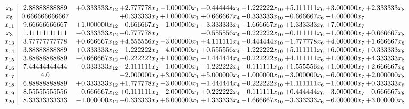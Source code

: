 \documentclass[10pt]{article}
\begin{document}
 \[\begin{array}{c| c c@{\hskip 2pt} c@{\hskip 2pt} c@{\hskip 2pt} c@{\hskip 2pt} c@{\hskip 2pt} c@{\hskip 2pt} c@{\hskip 2pt} c@{\hskip 2pt} }
 x_{9}   &  2.88888888889 & + 0.333333 x_{12} & + 2.777778 x_{2} & -1.000000 x_{1} & -0.444444 x_{4} & + 1.222222 x_{10} & + 5.111111 x_{6} & + 3.000000 x_{7} & + 2.333333 x_{8}\\
 x_{5}   &  0.666666666667  &   & + 0.333333 x_{2} & + 1.000000 x_{1} & + 0.666667 x_{4} & -0.333333 x_{10} & -0.666667 x_{6} & -1.000000 x_{7} &   \\
 x_{11}   &  9.66666666667 & + 1.000000 x_{12} & -0.666667 x_{2} & -1.000000 x_{1} & -3.333333 x_{4} & + 1.666667 x_{10} & + 1.333333 x_{6} & + 7.000000 x_{7} &   \\
 x_{3}   &  1.11111111111 & -0.333333 x_{12} & -0.777778 x_{2} &   & -0.555556 x_{4} & -0.222222 x_{10} & -0.111111 x_{6} & -1.000000 x_{7} & + 0.666667 x_{8}\\
 x_{13}   &  3.77777777778 & + 0.666667 x_{12} & + 4.555556 x_{2} & -3.000000 x_{1} & + 4.111111 x_{4} & + 0.444444 x_{10} & -1.777778 x_{6} & + 4.000000 x_{7} & + 1.666667 x_{8}\\
 x_{14}   &  3.88888888889 & + 0.333333 x_{12} & -1.222222 x_{2} & -4.000000 x_{1} & + 0.555556 x_{4} & + 1.222222 x_{10} & + 5.111111 x_{6} & + 6.000000 x_{7} & + 0.333333 x_{8}\\
 x_{15}   &  3.88888888889 & -0.666667 x_{12} & -0.222222 x_{2} & + 1.000000 x_{1} & -1.444444 x_{4} & + 0.222222 x_{10} & + 4.111111 x_{6} & + 1.000000 x_{7} & + 4.333333 x_{8}\\
 x_{16}   &  7.44444444444 & -0.333333 x_{12} & -2.111111 x_{2} & -1.000000 x_{1} & -1.222222 x_{4} & + 0.111111 x_{10} & + 1.555556 x_{6} & + 1.000000 x_{7} & + 2.666667 x_{8}\\
 x_{17}   &  4.0  &   & -2.000000 x_{2} & + 3.000000 x_{1} & + 5.000000 x_{4} & -1.000000 x_{10} & -3.000000 x_{6} & -6.000000 x_{7} & + 2.000000 x_{8}\\
 x_{18}   &  6.88888888889 & + 0.333333 x_{12} & + 1.777778 x_{2} & -3.000000 x_{1} & -1.444444 x_{4} & + 0.222222 x_{10} & + 1.111111 x_{6} & -1.000000 x_{7} & + 0.333333 x_{8}\\
 x_{19}   &  8.55555555556 & -0.666667 x_{12} & + 0.111111 x_{2} & -2.000000 x_{1} & + 0.222222 x_{4} & -0.111111 x_{10} & + 0.444444 x_{6} & -3.000000 x_{7} & -0.666667 x_{8}\\
 x_{20}   &  8.33333333333 & -1.000000 x_{12} & -0.333333 x_{2} & + 6.000000 x_{1} & + 1.333333 x_{4} & -1.666667 x_{10} & -3.333333 x_{6} & -6.000000 x_{7} & + 3.000000 x_{8}\\

\end{array}\]
\end{document}
